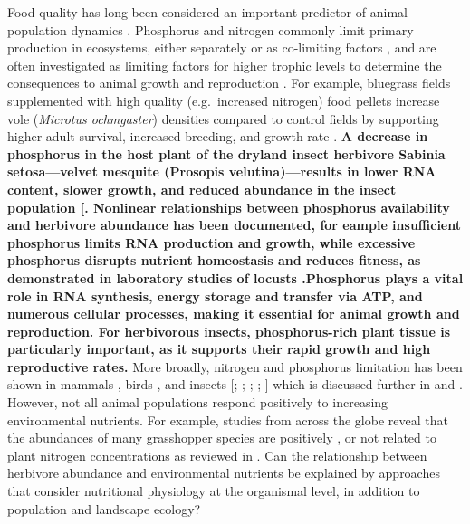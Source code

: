 \documentclass[
]{article}
\begin{document}
Food quality has long been considered an important predictor of animal
population dynamics
\citep{andersen_stoichiometry_2004, white_inadequate_1993}. Phosphorus
and nitrogen commonly limit primary production in ecosystems, either
separately or as co-limiting factors
\citep{tyrrell_relative_1999, vitousek_terrestrial_2010}, and are often
investigated as limiting factors for higher trophic levels to determine
the consequences to animal growth and reproduction
\citep{andersen_stoichiometry_2004}. For example, bluegrass fields
supplemented with high quality (e.g.~increased nitrogen) food pellets
increase vole (\emph{Microtus ochmgaster}) densities compared to control
fields by supporting higher adult survival, increased breeding, and
growth rate \citep{cole_influence_1978}. \textbf{A decrease in
phosphorus in the host plant of the dryland insect herbivore Sabinia
setosa---velvet mesquite (Prosopis velutina)---results in lower RNA
content, slower growth, and reduced abundance in the insect population
{[}\citet{schade_stoichiometric_2003}. Nonlinear relationships between
phosphorus availability and herbivore abundance has been documented, for
eample insufficient phosphorus limits RNA production and growth, while
excessive phosphorus disrupts nutrient homeostasis and reduces fitness,
as demonstrated in laboratory studies of locusts
\citep{cease_dietary_2016}.Phosphorus plays a vital role in RNA
synthesis, energy storage and transfer via ATP, and numerous cellular
processes, making it essential for animal growth and reproduction. For
herbivorous insects, phosphorus-rich plant tissue is particularly
important, as it supports their rapid growth and high reproductive
rates\citep{sterner2003, andersen_stoichiometry_2004}.} More broadly,
nitrogen and phosphorus limitation has been shown in mammals
\citep{randolph_nutritional_1995, white_inadequate_1993}, birds
\citep{forero_conspecific_2002, granbom_food_2006}, and insects
{[}\citet{floyd_frontiers_1996}; \citet{huberty_consequences_2006};
\citet{marsh_decline_1995}; ; \citet{perkins_dietary_2004}{]} which is
discussed further in \citet{white_role_2008} and
\citet{andersen_stoichiometry_2004}. However, not all animal populations
respond positively to increasing environmental nutrients. For example,
studies from across the globe reveal that the abundances of many
grasshopper species are positively
\citep{joern_not_2012, ozment_tracking_2021, welti_bottomup_2020, welti_nutrient_2020, zhu_effects_2020, zhu_negative_2019},
or not related
\citep{heidorn_feeding_1987, jonas_hostplant_2008, lenhart_water_2015, ozment_tracking_2021}
to plant nitrogen concentrations as reviewed in \citet{cease_how_2024}.
Can the relationship between herbivore abundance and environmental
nutrients be explained by approaches that consider nutritional
physiology at the organismal level, in addition to population and
landscape ecology?
\end{document}
